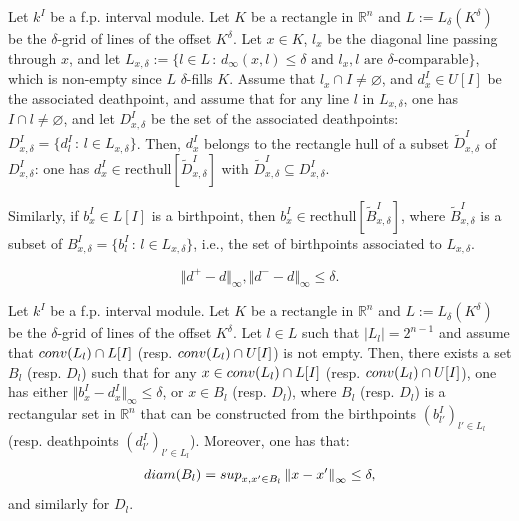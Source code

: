 \documentclass[10pt,a4paper]{amsart}
\newcommand{\R}{\mathbb{R}}
\newcommand{\conv}[1]{ {\rm conv}(#1) }
\newcommand{\lowerb}[1]{ L[#1] }
\newcommand{\norm}[1]{\left\lVert #1 \right\rVert}
\newcommand{\upperb}[1]{ U[#1] }
\begin{document}
\begin{lemma}\label{lemma:boundary_bound}
	Let $k^I$ be a {f.p.} interval module. Let $K$ be a rectangle in $\R^n$ and $L:=L_\delta(K^\delta)$ be the $\delta$-grid of lines of the offset $K^\delta$.
	Let $x\in K$, $l_x$ be the diagonal line passing through $x$, and let $
	L_{x,\delta}:=\{l\in L\,:\, d_\infty(x,l) \leq \delta \text{ and } l_x, l \text{ are $\delta$-comparable}\}
	$, which is non-empty since
	$L$ $\delta$-fills $K$.
	Assume that $l_x\cap I\neq \varnothing$, and $d^I_x \in \upperb{I}$ be the associated deathpoint, and
	assume that for any line $l$ in $L_{x,\delta}$, one has $I\cap l\neq \varnothing$, and
	let $D_{x,\delta}^I$ be the set of the associated deathpoints: $D_{x,\delta}^I=\{d_l^I\,:\, l\in L_{x,\delta}\}$.
	Then, $d^I_x$ belongs to the rectangle hull of a subset $\tilde
	D_{x,\delta}^I$ of $D_{x,\delta}^I$: one has $d^I_x\in \mathrm{recthull} [\tilde D_{x,\delta}^I]$ with $\tilde D_{x,\delta}^I \subseteq D_{x,\delta}^I$.

	Similarly, if $b^I_x\in \lowerb{I}$ is a birthpoint, then $b^I_x\in\mathrm{
	recthull}[\tilde B_{x,\delta}^I]$, where $\tilde B_{x,\delta}^I$ is a subset of $B_{x,\delta}^I=\{b_l^I\,:\, l\in L_{x,\delta}\}$, i.e., the set of birthpoints associated to $L_{x,\delta}$. \\
\end{lemma}

	\begin{equation}\label{eq:surr}
		\Vert d^+ - d\Vert_\infty, \Vert d^- - d\Vert_\infty \le \delta.
	\end{equation}

\begin{proposition}\label{prop:local_bound}
	Let ${k^{I}}$ be a {f.p.} interval module. Let $K$ be a rectangle in $\R^n$ and $L:=L_\delta(K^\delta)$ be the $\delta$-grid of lines of the offset $K^\delta$.
	Let $l\in L$ such that $|L_l| = 2^{n-1}$ and assume that $\conv{L_l} \cap \lowerb{I}$ (resp. $\conv{L_l} \cap \upperb{I}$) is not empty.
	Then, there exists a set $B_l$ (resp. $D_l$) such that for any $x\in \conv{L_l} \cap \lowerb{I}$ (resp. $\conv{L_l} \cap \upperb{I}$),
	one has either  $\Vert b_x^I -d_x^I \Vert_\infty \le \delta$, or
	$x \in B_l$ (resp. $D_l$), where $B_l$ (resp. $D_l$) is a rectangular set in
	$\R^n$ that can be constructed from the birthpoints $(b_{l'}^I)_{l'\in L_l}$  (resp. deathpoints $(d_{l'}^I)_{l'\in L_l}$). %
	Moreover, one has that:
	\begin{equation}\label{eq:diam}
		{\rm diam}(B_l)={\rm sup}_{x,x'\in B_l}\norm{x-x'}_\infty \leq \delta,
	\end{equation}
	and similarly for $D_l$. %

\end{proposition}
\end{document}
